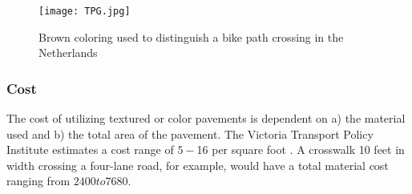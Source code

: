 \begin{figure}[h]
\centering
\texttt{[image: TPG.jpg]}
\caption[Brown coloring used to distinguish a bike path crossing in the Netherlands]{Brown coloring used to distinguish a bike path crossing in the Netherlands}\label{fig:TPG}
\end{figure}

\subsubsection{Cost}

The cost of utilizing textured or color pavements is dependent on a) the material used and b) the total area of the pavement. The Victoria Transport Policy Institute estimates a cost range of $5-$16 per square foot \cite{TP3}. A crosswalk 10 feet in width crossing a four-lane road, for example, would have a total material cost ranging from $2400 to $7680.
